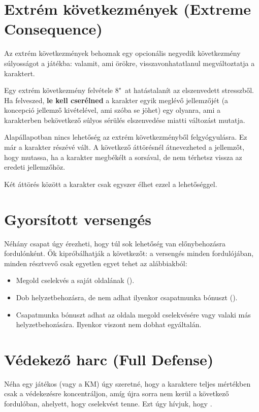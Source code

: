 \section[Extrém következmények]{Extrém következmények (Extreme Consequence)}

Az extrém következmények behoznak egy opcionális negyedik következmény súlyosságot a játékba: valamit, ami örökre, visszavonhatatlanul megváltoztatja a karaktert.

Egy extrém következmény felvétele 8"~at hatástalanít az elszenvedett stresszből. Ha felveszed, \textbf{le kell cserélned} a karakter egyik meglévő jellemzőjét (a koncepció jellemző kivételével, ami szóba se jöhet) egy olyanra, ami a karakterben bekövetkező súlyos sérülés elszenvedése miatti változást mutatja.

Alapállapotban nincs lehetőség az extrém következményből felgyógyulásra. Ez már a karakter részévé vált. A következő áttörésnél átnevezheted a jellemzőt, hogy mutassa, ha a karakter megbékélt a sorsával, de nem térhetsz vissza az eredeti jellemzőhöz.

Két áttörés között a karakter csak egyszer élhet ezzel a lehetőséggel.

\section{Gyorsított versengés}

Néhány csapat úgy érezheti, hogy túl sok lehetőség van előnybehozásra fordulónként. Ők kipróbálhatják a következőt: a versengés minden fordulójában, minden résztvevő csak egyetlen egyet tehet az alábbiakból:

\begin{itemize}
    \item Megold cselekvés a saját oldalának ().
    \item Dob helyzetbehozásra, de nem adhat ilyenkor csapatmunka bónuszt ().
    \item Csapatmunka bónuszt adhat az oldala megold cselekvésére vagy valaki más helyzetbehozására. Ilyenkor viszont nem dobhat egyáltalán.
\end{itemize}

\section[Védekező harc]{Védekező harc (Full Defense)}

Néha egy játékos (vagy a KM) úgy szeretné, hogy a karaktere teljes mértékben csak a védekezésre koncentráljon, amíg újra sorra nem kerül a következő fordulóban, ahelyett, hogy cselekvést tenne. Ezt úgy hívjuk, hogy .

